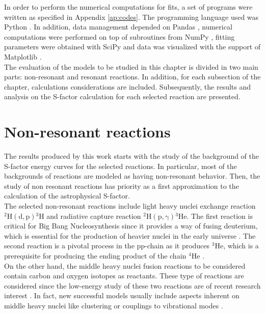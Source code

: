 \documentclass[openany]{book}
\begin{document}
In order to perform the numerical computations for fits, a set of programs were written as specified in Appendix \ref{ap:codes}. The programming language used was Python \cite{rossum_drake_2009}. In addition, data management depended on Pandas \cite{mckinney_2010}, numerical computations were performed on top of subroutines from NumPy  \cite{harris_millman_vanderwalt_gommers_virtanen_cournapeau_wieser_taylor_berg_smith_et_2020}, fitting parameters were obtained with SciPy \cite{virtanen_gommers_oliphant_haberland_reddy_cournapeau_burovski_peterson_weckesser_bright_et_2020} and data was visualized with the support of Matplotlib \cite{hunter_2007}. \\

The evaluation of the models to be studied in this chapter is divided in two main parts: non-resonant and resonant reactions.  In addition, for each subsection of the chapter, calculations considerations are included. Subsequently, the results and analysis on the S-factor calculation for each  selected reaction are presented.

\section{Non-resonant reactions} \label{sec:nonResonant}

The  results produced by this work starts with the study of the background of the S-factor energy curves for the selected reactions. In particular, most of the backgrounds of reactions are modeled as having non-resonant behavior. Then, the study of non resonant reactions has priority as a first approximation to the calculation of the astrophysical S-factor. \\

The selected non-resonant reactions include light heavy nuclei exchange reaction $\mathrm{{}^{2}{H}(d,p){}^{3}{H}} $ and radiative capture reaction  $\mathrm{{}^{2}{H} (p, \gamma) {}^{3}{He}} $. The first reaction is critical for Big Bang Nucleosynthesis since it provides a way of fusing deuterium, which is essential for the production of heavier nuclei in the early universe \cite{coc_vangioni_2010}. The second reaction is a pivotal process in the pp-chain as it produces $\mathrm{{}^{3}He}$, which is a prerequisite  for producing the ending product of the chain $\mathrm{{}^{4}He}$ \cite{fowler_1958}. \\

 On the other hand, the middle heavy nuclei fusion reactions to be considered contain carbon and oxygen isotopes as reactants. These type of reactions are considered since the low-energy study of these two reactions are of recent research interest \cite{mukhamedzhanov_pang_kadyrov_2019, taniguchi_kimura_2021, torilov_maltsev_zherebchevsky_2021}. In fact, new successful models usually include aspects inherent on middle heavy nuclei like clustering \cite{assuncao_descouvemont_2016} or couplings to vibrational modes \cite{duarte_gasques_oliveira_zagatto_chamon_medina_added_seale_alcantara-nunez_rossi_et_2015}. \\
 
\end{document}
